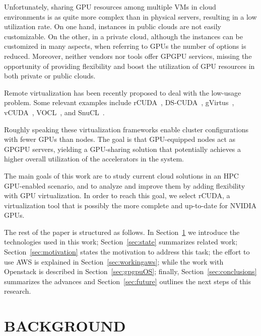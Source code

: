 \documentclass[a4paper,twoside]{article}
\begin{document}
Unfortunately, sharing GPU resources among multiple VMs in cloud environments 
is as quite more complex than in physical servers, resulting in a low utilization rate.
On one hand, instances in public clouds are not easily customizable. 
On the other, in a private cloud, although the instances can be customized in many aspects, when referring to GPUs
the number of options is reduced.
Moreover, neither vendors nor tools offer GPGPU services, missing the opportunity of providing flexibility and boost the utilization of GPU resources in both private or public clouds.

Remote virtualization has been recently proposed to deal with the low-usage problem. Some relevant examples include {rCUDA}~\cite{tonithesis},
DS-CUDA~\cite{dscuda}, gVirtus~\cite{gvirtus}, vCUDA~\cite{vcuda}, VOCL~\cite{vocl}, and SnuCL~\cite{snucl}.

Roughly speaking these virtualization frameworks 
enable cluster configurations with fewer GPUs than nodes.  The goal is that 
GPU-equipped nodes act as GPGPU servers, yielding a GPU-sharing solution that potentially achieves
a higher overall utilization of the accelerators in the system.

The main goals of this work are to study current cloud solutions in an HPC GPU-enabled scenario, and to analyze and improve 
them by adding flexibility with GPU virtualization. In order to reach 
this goal, we select rCUDA, a virtualization tool that is possibly the more complete 
and up-to-date for NVIDIA GPUs.

The rest of the paper is structured as follows. 
In Section~\ref{sec:background} we introduce the technologies used in this work;
Section~\ref{sec:state} summarizes related work; 
Section~\ref{sec:motivation} states the motivation to address this task;
the effort to use AWS is explained in Section~\ref{sec:workingaws};
while the work with Openstack is described in Section~\ref{sec:gpgpuOS};
finally, Section~\ref{sec:conclusions} summarizes the advances and Section~\ref{sec:future} outlines the next steps
 of this research.

\section{\uppercase{Background}}
\label{sec:background}
\end{document}
